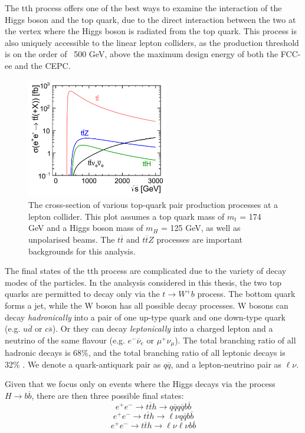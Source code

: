 The tth process offers one of the best ways to examine the interaction of the Higgs boson and the top quark, due to the direct interaction between the two at the vertex where the Higgs boson is radiated from the top quark. This process is also uniquely accessible to the linear lepton colliders, as the production threshold is on the order of ~500 GeV, above the maximum design energy of both the \acrshort{FCC}-ee and the \acrshort{CEPC}.

\begin{figure}[h]
	\centering
	\includegraphics[width=0.55\textwidth]{../Pictures/Analysis/tt-production-crosssection.png}
	\caption{The cross-section of various top-quark pair production processes at a lepton collider. This plot assumes a top quark mass of $m_t$ = 174 GeV and a Higgs boson mass of $m_H$ = 125 GeV, as well as unpolarised beams. The $t\overline{t}$ and $t\overline{t}Z$ processes are important backgrounds for this analysis.}
	\label{figure:analysis/top-quark-plot}
\end{figure}

The final states of the tth process are complicated due to the variety of decay modes of the particles. In the analsysis considered in this thesis, the two top quarks are permitted to decay only via the $t \rightarrow W^+ b $ process. The bottom quark forms a jet, while the W boson has all possible decay processes. W bosons can decay \textit{hadronically} into a pair of one up-type quark and one down-type quark (e.g. $u\overline{d}$ or $c\overline{s}$). Or they can decay \textit{leptonically} into a charged lepton and a neutrino of the same flavour (e.g. $e^- \overline{\nu}_e$ or $\mu^+ \nu_\mu$). The total branching ratio of all hadronic decays is 68\%, and the total branching ratio of all leptonic decays is 32\% \cite{pdg-review}. We denote a quark-antiquark pair as $q\overline{q}$, and a lepton-neutrino pair as $\ell \nu$.

Given that we focus only on events where the Higgs decays via the process $H \rightarrow b\overline{b}$, there are then three possible final states: %
$$e^+ e^- \rightarrow t\overline{t}h \rightarrow q\overline{q}q\overline{q}b\overline{b}$$
$$e^+ e^- \rightarrow t\overline{t}h \rightarrow \ell \nu q \overline{q} b \overline{b}$$
$$e^+ e^- \rightarrow t\overline{t}h \rightarrow \ell \nu \ell \nu b \overline{b}$$


